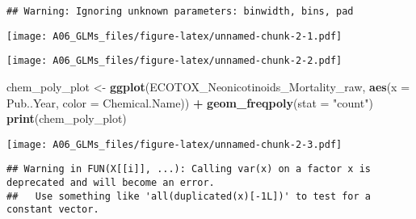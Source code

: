 \documentclass[]{article}
\newenvironment{Shaded}{\begin{snugshade}}{\end{snugshade}}
\newcommand{\KeywordTok}[1]{\textcolor[rgb]{0.13,0.29,0.53}{\textbf{#1}}}
\newcommand{\DataTypeTok}[1]{\textcolor[rgb]{0.13,0.29,0.53}{#1}}
\newcommand{\StringTok}[1]{\textcolor[rgb]{0.31,0.60,0.02}{#1}}
\newcommand{\CommentTok}[1]{\textcolor[rgb]{0.56,0.35,0.01}{\textit{#1}}}
\newcommand{\OperatorTok}[1]{\textcolor[rgb]{0.81,0.36,0.00}{\textbf{#1}}}
\newcommand{\NormalTok}[1]{#1}
\begin{document}
\begin{verbatim}
## Warning: Ignoring unknown parameters: binwidth, bins, pad
\end{verbatim}

\texttt{[image: A06\_GLMs\_files/figure-latex/unnamed-chunk-2-1.pdf]}

\begin{Shaded}
\end{Shaded}

\texttt{[image: A06\_GLMs\_files/figure-latex/unnamed-chunk-2-2.pdf]}

\begin{Shaded}
\begin{Highlighting}[]
\NormalTok{chem_poly_plot <-}\StringTok{ }\KeywordTok{ggplot}\NormalTok{(ECOTOX_Neonicotinoids_Mortality_raw, }\KeywordTok{aes}\NormalTok{(}\DataTypeTok{x =}\NormalTok{ Pub..Year, }\DataTypeTok{color =}\NormalTok{ Chemical.Name)) }\OperatorTok{+}
\StringTok{  }\KeywordTok{geom_freqpoly}\NormalTok{(}\DataTypeTok{stat =} \StringTok{"count"}\NormalTok{)}
\KeywordTok{print}\NormalTok{(chem_poly_plot)}
\end{Highlighting}
\end{Shaded}

\texttt{[image: A06\_GLMs\_files/figure-latex/unnamed-chunk-2-3.pdf]}

\begin{Shaded}
\end{Shaded}

\begin{verbatim}
## Warning in FUN(X[[i]], ...): Calling var(x) on a factor x is deprecated and will become an error.
##   Use something like 'all(duplicated(x)[-1L])' to test for a constant vector.
\end{verbatim}
\end{document}

